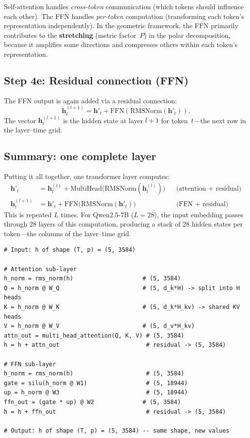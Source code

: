 \documentclass[11pt, twoside, openright]{memoir}
\begin{document}
\begin{keyidea}
Self-attention handles \emph{cross-token} communication (which tokens
should influence each other).  The FFN handles \emph{per-token} computation
(transforming each token's representation independently).  In the geometric
framework, the FFN primarily contributes to the \textbf{stretching}
(metric factor~$P$) in the polar decomposition, because it amplifies some
directions and compresses others within each token's representation.
\end{keyidea}

\subsection{Step 4e: Residual connection (FFN)}

The FFN output is again added via a residual connection:
\[
  \mathbf{h}^{(l+1)}_t = \mathbf{h}'_t + \text{FFN}(\text{RMSNorm}(\mathbf{h}'_t)).
\]
The vector $\mathbf{h}^{(l+1)}_t$ is the hidden state at layer $l+1$ for
token~$t$---the next row in the layer--time grid.

\subsection{Summary: one complete layer}

Putting it all together, one transformer layer computes:
\begin{align*}
  \mathbf{h}'_t &= \mathbf{h}^{(l)}_t + \text{MultiHead}\bigl(\text{RMSNorm}(\mathbf{h}^{(l)}_t)\bigr)
  && \text{(attention + residual)} \\
  \mathbf{h}^{(l+1)}_t &= \mathbf{h}'_t + \text{FFN}\bigl(\text{RMSNorm}(\mathbf{h}'_t)\bigr)
  && \text{(FFN + residual)}
\end{align*}
This is repeated $L$ times.  For Qwen2.5-7B ($L = 28$), the input embedding
passes through 28 layers of this computation, producing a stack of 28 hidden
states per token---the columns of the layer--time grid.

\begin{lstlisting}[caption={Tracing the shapes through one layer (pseudocode)}]
# Input: h of shape (T, p) = (5, 3584)

# Attention sub-layer
h_norm = rms_norm(h)                    # (5, 3584)
Q = h_norm @ W_Q                        # (5, d_k*H) -> split into H heads
K = h_norm @ W_K                        # (5, d_k*H_kv) -> shared KV heads
V = h_norm @ W_V                        # (5, d_v*H_kv)
attn_out = multi_head_attention(Q, K, V) # (5, 3584)
h = h + attn_out                         # residual -> (5, 3584)

# FFN sub-layer
h_norm = rms_norm(h)                     # (5, 3584)
gate = silu(h_norm @ W1)                 # (5, 18944)
up = h_norm @ W3                         # (5, 18944)
ffn_out = (gate * up) @ W2              # (5, 3584)
h = h + ffn_out                          # residual -> (5, 3584)

# Output: h of shape (T, p) = (5, 3584) -- same shape, new values
\end{lstlisting}
\end{document}
